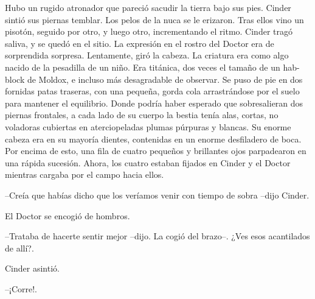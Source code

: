 Hubo un rugido atronador que pareció sacudir la tierra bajo sus pies. Cinder sintió sus piernas temblar. Los pelos de la nuca se le erizaron.
Tras ellos vino un pisotón, seguido por otro, y luego otro, incrementando el ritmo. Cinder tragó saliva, y se quedó en el sitio. La expresión en el rostro del Doctor era de sorprendida sorpresa.
Lentamente, giró la cabeza.
La criatura era como algo nacido de la pesadilla de un niño. Era titánica, dos veces el tamaño de un hab-block de Moldox, e incluso más desagradable de observar. Se puso de pie en dos fornidas patas traseras, con una pequeña, gorda cola arrastrándose por el suelo para mantener el equilibrio. Donde podría haber esperado que sobresalieran dos piernas frontales, a cada lado de su cuerpo la bestia tenía alas, cortas, no voladoras cubiertas en aterciopeladas plumas púrpuras y blancas. Su enorme cabeza era en su mayoría dientes, contenidas en un enorme desfiladero de boca. Por encima de esto, una fila de cuatro pequeños y brillantes ojos parpadearon en una rápida sucesión. Ahora, los cuatro estaban fijados en Cinder y el Doctor mientras cargaba por el campo hacia ellos.

--Creía que habías dicho que los veríamos venir con tiempo de sobra --dijo Cinder.

El Doctor se encogió de hombros. 

--Trataba de hacerte sentir mejor --dijo. La cogió del brazo--. ¿Ves esos acantilados de allí?.

Cinder asintió.

--¡Corre!.

